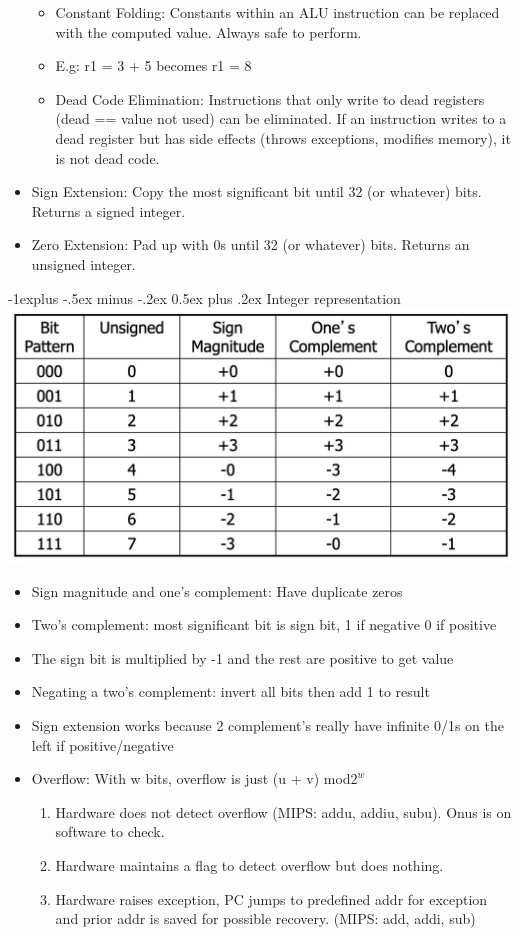 \documentclass[8pt, landscape]{extarticle}
\makeatletter
\renewcommand{\subsection}{\@startsection{subsection}{2}{0mm}%
  {-1explus -.5ex minus -.2ex}%
  {0.5ex plus .2ex}%
{\normalfont\normalsize\bfseries}}
\makeatother
\begin{document}
\begin{multicols*}{4}
\begin{itemize}
\begin{itemize}
      \item Constant Folding: Constants within an ALU instruction can be replaced with the computed value. Always safe to perform.
      \item E.g: r1 = 3 + 5 becomes r1 = 8
      \item Dead Code Elimination: Instructions that only write to dead registers (dead == value not used) can be eliminated. If an instruction writes to a dead register but has side effects (throws exceptions, modifies memory), it is not dead code.
    \end{itemize}
    \item Sign Extension: Copy the most significant bit until 32 (or whatever) bits. Returns a signed integer.
    \item Zero Extension: Pad up with 0s until 32 (or whatever) bits. Returns an unsigned integer.
  \end{itemize}

  \subsection{Integer representation}
  \includegraphics[width=0.9\linewidth]{integer_representation.jpg}
  \begin{itemize}
    \item Sign magnitude and one's complement: Have duplicate zeros
    \item Two's complement: most significant bit is sign bit, 1 if negative 0 if positive
    \item The sign bit is multiplied by -1 and the rest are positive to get value
    \item Negating a two's complement: invert all bits then add 1 to result
    \item Sign extension works because 2 complement's really have infinite 0/1s on the left if positive/negative
    \item Overflow: With w bits, overflow is just (u + v) mod$ 2^w$
    \begin{enumerate}
      \item Hardware does not detect overflow (MIPS: addu, addiu, subu). Onus is on software to check.
      \item Hardware maintains a flag to detect overflow but does nothing.
      \item Hardware raises exception, PC jumps to predefined addr for exception and prior addr is saved for possible recovery. (MIPS: add, addi, sub)
    \end{enumerate}
  \end{itemize}


\end{multicols*}
\end{document}
